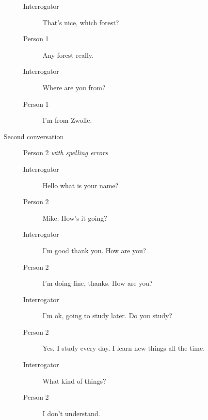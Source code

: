 \begin{itemize}
\begin{description}
\begin{description}
               \item [Interrogator] That's nice, which forest?
               \item [Person 1] Any forest really.
               \item [Interrogator] Where are you from?
               \item [Person 1] I'm from Zwolle.
            \end{description}
         \item [Second conversation] Person 2 \textit{with spelling errors}
            \begin{description}
               \item [Interrogator] Hello what is your name?
               \item [Person 2] Mike. How's it going?
               \item [Interrogator] I'm good thank you. How are you?
               \item [Person 2] I'm doing fine, thanks. How are you?
               \item [Interrogator] I'm ok, going to study later. Do you study?
               \item [Person 2] Yes. I study every day. I learn new things all the time.
               \item [Interrogator] What kind of things?
               \item [Person 2] I don't understand.
            \end{description}
      \end{description}


\end{itemize}
